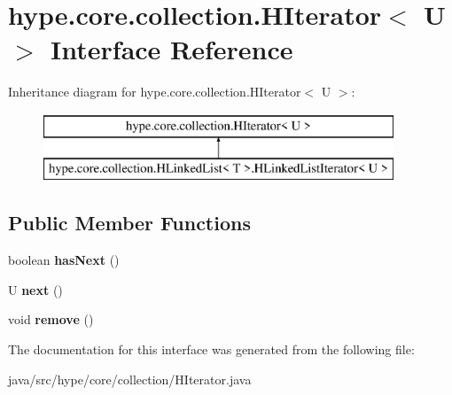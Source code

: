 \hypertarget{interfacehype_1_1core_1_1collection_1_1_h_iterator_3_01_u_01_4}{\section{hype.\-core.\-collection.\-H\-Iterator$<$ U $>$ Interface Reference}
\label{interfacehype_1_1core_1_1collection_1_1_h_iterator_3_01_u_01_4}
}
Inheritance diagram for hype.\-core.\-collection.\-H\-Iterator$<$ U $>$\-:\begin{figure}[H]
\begin{center}
\leavevmode
\includegraphics[height=2.000000cm]{interfacehype_1_1core_1_1collection_1_1_h_iterator_3_01_u_01_4}
\end{center}
\end{figure}
\subsection*{Public Member Functions}
\begin{DoxyCompactItemize}
\item 
\hypertarget{interfacehype_1_1core_1_1collection_1_1_h_iterator_3_01_u_01_4_a9e6ffafb6e6bd3b5f57414df67569be9}{boolean {\bfseries has\-Next} ()}\label{interfacehype_1_1core_1_1collection_1_1_h_iterator_3_01_u_01_4_a9e6ffafb6e6bd3b5f57414df67569be9}

\item 
\hypertarget{interfacehype_1_1core_1_1collection_1_1_h_iterator_3_01_u_01_4_af0710645b265b61dc9b3f29f5ace4704}{U {\bfseries next} ()}\label{interfacehype_1_1core_1_1collection_1_1_h_iterator_3_01_u_01_4_af0710645b265b61dc9b3f29f5ace4704}

\item 
\hypertarget{interfacehype_1_1core_1_1collection_1_1_h_iterator_3_01_u_01_4_a9d7efba8a8f7421083292bea6c834e5c}{void {\bfseries remove} ()}\label{interfacehype_1_1core_1_1collection_1_1_h_iterator_3_01_u_01_4_a9d7efba8a8f7421083292bea6c834e5c}

\end{DoxyCompactItemize}


The documentation for this interface was generated from the following file\-:\begin{DoxyCompactItemize}
\item 
java/src/hype/core/collection/H\-Iterator.\-java\end{DoxyCompactItemize}
